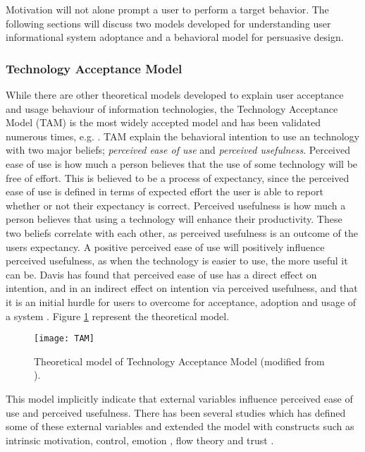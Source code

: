 Motivation will not alone prompt a user to perform a target behavior. The following sections will discuss two models developed for understanding user informational system adoptance and a behavioral model for persuasive design.

\subsubsection{Technology Acceptance Model}
While there are other theoretical models developed to explain user acceptance and usage behaviour of information technologies, the Technology Acceptance Model (TAM) \cite{Davis1989} \cite{Davis1989a} is the most widely accepted model and has been validated numerous times, e.g. \cite{Hu1999} \cite{Chau1996} \cite{Mathieson1991}. TAM explain the behavioral intention to use an technology with two major beliefs; \textit{perceived ease of use} and \textit{perceived usefulness}. Perceived ease of use is how much a person believes that the use of some technology will be free of effort. This is believed to be a process of expectancy, since the perceived ease of use is defined in terms of expected effort the user is able to report whether or not their expectancy is correct. Perceived usefulness is how much a person believes that using a technology will enhance their productivity. These two beliefs correlate with each other, as perceived usefulness is an outcome of the users expectancy. A positive perceived ease of use will positively influence perceived usefulness, as when the technology is easier to use, the more useful it can be. Davis \cite{Davis1989} has found that perceived ease of use has a direct effect on intention, and in an indirect effect on intention via perceived usefulness, and that it is an initial hurdle for users to overcome for acceptance, adoption and usage of a system \cite{Davis1989a}. Figure \ref{fig:TAM} represent the theoretical model.

\begin{figure}[h]
  \centering
    \texttt{[image: TAM]}
  \caption{Theoretical model of Technology Acceptance Model (modified from \cite{Davis1989}).}
  \label{fig:TAM}
\end{figure}

This model implicitly indicate that external variables influence perceived ease of use and perceived usefulness. There has been several studies which has defined some of these external variables and extended the model with constructs such as intrinsic motivation, control, emotion \cite{Venkatesh2000}, flow theory \cite{Koufaris2002} and trust \cite{Gefen2003}.

